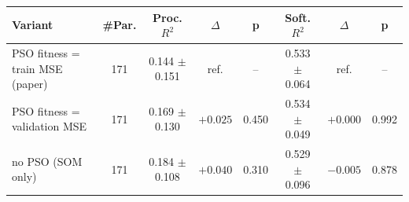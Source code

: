 \begin{tabular}{lccccccc}
\hline
Variant & \#Par. & Proc. $R^2$ & $\Delta$ & p & Soft. $R^2$ & $\Delta$ & p \\
\hline
PSO fitness = train MSE (paper) & 171 & 0.144 $\pm$ 0.151 & ref. & -- & 0.533 $\pm$ 0.064 & ref. & -- \\
PSO fitness = validation MSE & 171 & 0.169 $\pm$ 0.130 & $+0.025$ & 0.450 & 0.534 $\pm$ 0.049 & $+0.000$ & 0.992 \\
no PSO (SOM only) & 171 & 0.184 $\pm$ 0.108 & $+0.040$ & 0.310 & 0.529 $\pm$ 0.096 & $-0.005$ & 0.878 \\
\hline
\end{tabular}
